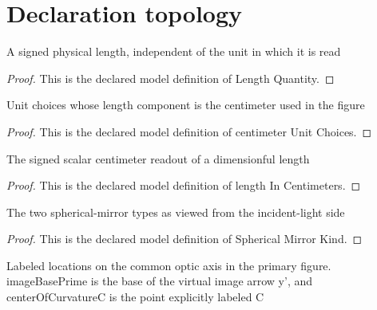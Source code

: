 \section{Declaration topology}
\begin{definition}
  \label{def:physics:phyx-mini-0039:phyxminiproblems-problemphyxmini0039-lengthquantity}
  A signed physical length, independent of the unit in which it is read
\end{definition}
\begin{proof}
  This is the declared model definition of Length Quantity.
\end{proof}
\begin{definition}
  \label{def:physics:phyx-mini-0039:phyxminiproblems-problemphyxmini0039-centimeterunitchoices}
  Unit choices whose length component is the centimeter used in the figure
\end{definition}
\begin{proof}
  This is the declared model definition of centimeter Unit Choices.
\end{proof}
\begin{definition}
  \label{def:physics:phyx-mini-0039:phyxminiproblems-problemphyxmini0039-lengthincentimeters}
  The signed scalar centimeter readout of a dimensionful length
\end{definition}
\begin{proof}
  This is the declared model definition of length In Centimeters.
\end{proof}
\begin{definition}
  \label{def:physics:phyx-mini-0039:phyxminiproblems-problemphyxmini0039-sphericalmirrorkind}
  The two spherical-mirror types as viewed from the incident-light side
\end{definition}
\begin{proof}
  This is the declared model definition of Spherical Mirror Kind.
\end{proof}
\begin{definition}
  \label{def:physics:phyx-mini-0039:phyxminiproblems-problemphyxmini0039-axislocation}
  Labeled locations on the common optic axis in the primary figure. imageBasePrime is the base of the virtual image arrow y', and centerOfCurvatureC is the point explicitly labeled C
\end{definition}
